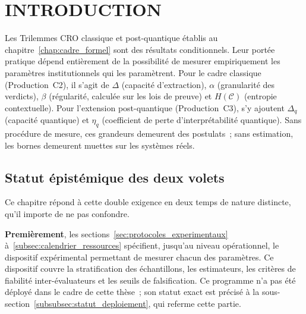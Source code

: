 
\section{INTRODUCTION}
\label{sec:introduction_experimentation}
\begin{sloppypar}

Les Trilemmes CRO classique et post-quantique \'etablis au
chapitre~\ref{chap:cadre_formel} sont des r\'esultats conditionnels. Leur
port\'ee pratique d\'epend enti\`erement de la possibilit\'e de mesurer
empiriquement les param\`etres institutionnels qui les param\`etrent. Pour le
cadre classique (Production~C2), il s'agit de $\Delta$ (capacit\'e
d'extraction), $\alpha$ (granularit\'e des verdicts), $\beta$ (r\'egularit\'e, calcul\'ee sur les lois
de preuve) et $H(\mathcal{C})$ (entropie contextuelle). Pour l'extension post-quantique
(Production~C3), s'y ajoutent $\Delta_q$ (capacit\'e quantique) et $\eta_q$
(coefficient de perte d'interpr\'etabilit\'e quantique). Sans proc\'edure de
mesure, ces grandeurs demeurent des postulats~; sans estimation, les bornes
demeurent muettes sur les syst\`emes r\'eels.

\subsection{Statut \'epist\'emique des deux volets}
\label{subsec:statut_epistemique}

Ce chapitre r\'epond \`a cette double exigence en deux temps de nature
distincte, qu'il importe de ne pas confondre.

\textbf{Premi\`erement}, les
sections~\ref{sec:protocoles_experimentaux}
\`a~\ref{subsec:calendrier_ressources} sp\'ecifient, jusqu'au niveau
op\'erationnel, le dispositif exp\'erimental permettant de mesurer chacun des
param\`etres. Ce dispositif couvre la stratification des \'echantillons, les estimateurs, les crit\`eres de
fiabilit\'e inter-\'evaluateurs et les seuils de falsification. Ce programme n'a pas
\'et\'e d\'eploy\'e dans le cadre de cette th\`ese~; son statut exact est
pr\'ecis\'e \`a la sous-section~\ref{subsubsec:statut_deploiement}, qui referme
cette partie.


\end{sloppypar}
